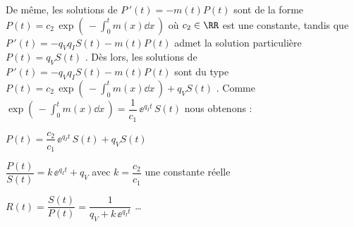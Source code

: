 \medskip

De même, les solutions de $P\,'(t) = - m(t) P(t)$ sont de la forme $\displaystyle P(t) = c_2 \, \exp \left( \, - \int_0^t m(x) \dd{x} \, \right)$ où $c_2 \in \RR$ est une constante, tandis que $P\,'(t) = - q_V q_I S(t) - m(t) P(t)$ admet la solution particulière $P(t) = q_V S(t)$ .
Dès lors, les solutions de $P\,'(t) = - q_V q_I S(t) - m(t) P(t)$ sont du type
$\displaystyle P(t) = c_2 \, \exp \left( \, - \int_0^t m(x) \dd{x} \, \right) + q_V S(t)$ .
Comme $\displaystyle \exp \left( \, - \int_0^t m(x) \dd{x} \, \right) = \dfrac{1}{c_1} \, \ee^{q_I t} \, S(t)$ nous obtenons :

\medskip

$P(t) = \dfrac{c_2}{c_1} \, \ee^{q_I t} \, S(t) + q_V S(t)$

\medskip

$\dfrac{P(t)}{S(t)} = k \, \ee^{q_I t} + q_V$ avec $k = \dfrac{c_2}{c_1}$ une constante réelle

\medskip

$R(t) = \dfrac{S(t)}{P(t)} = \dfrac{1}{q_V + k \, \ee^{q_I t}}$ \dots
